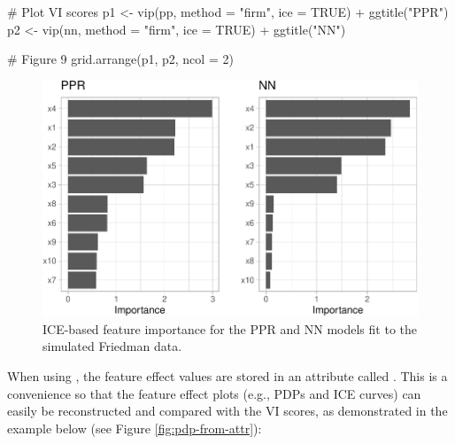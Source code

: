 \begin{Schunk}
\begin{Sinput}
# Plot VI scores
p1 <- vip(pp, method = "firm", ice = TRUE) + ggtitle("PPR")
p2 <- vip(nn, method = "firm", ice = TRUE) + ggtitle("NN")

# Figure 9
grid.arrange(p1, p2, ncol = 2)
\end{Sinput}
\begin{figure}[!htb]

{\centering \includegraphics[width=0.7\linewidth]{greenwell-boehmke_files/figure-latex/vip-ice-ppr-nn-1} 

}

\caption[ICE-based feature importance for the PPR and NN models fit to the simulated Friedman data]{ICE-based feature importance for the PPR and NN models fit to the simulated Friedman data.}\label{fig:vip-ice-ppr-nn}
\end{figure}
\end{Schunk}

When using , the feature effect values are stored
in an attribute called . This is a convenience so that
the feature effect plots (e.g., PDPs and ICE curves) can easily be
reconstructed and compared with the VI scores, as demonstrated in the
example below (see Figure \ref{fig:pdp-from-attr}):

